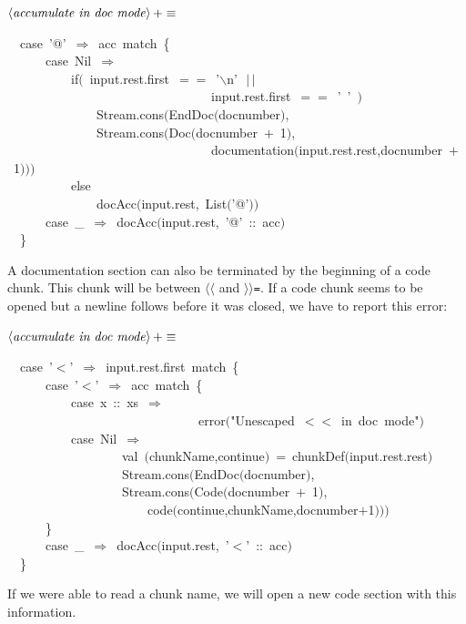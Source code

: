 \documentclass[a4paper,12pt]{article}
\begin{document}
$\left<\mbox{\emph{accumulate in doc mode}}\right>+\equiv$
\begin{program}~~{\vem case}~'@'~$\Rightarrow$~acc~{\vem match}~{\small\{}
\\~~~~~~{\vem case}~Nil~$\Rightarrow$
\\~~~~~~~~~~{\vem if}$($~input.rest.first~$==$~'$\backslash$n'~$\,|$$\,|$
\\~~~~~~~~~~~~~~~~~~~~~~~~~~~~~~~~input.rest.first~$==$~'~'~$)$
\\~~~~~~~~~~~~~~Stream.cons$($EndDoc$($docnumber$)$,
\\~~~~~~~~~~~~~~Stream.cons$($Doc$($docnumber~$+$~1$)$,
\\~~~~~~~~~~~~~~~~~~~~~~~~~~~~~~~~documentation$($input.rest.rest,docnumber~$+$~1$)$$)$$)$
\\~~~~~~~~~~{\vem else}
\\~~~~~~~~~~~~~~docAcc$($input.rest,~List$($'@'$)$$)$
\\~~~~~~{\vem case}~\_~$\Rightarrow$~docAcc$($input.rest,~'@'~{\rm :}{\rm :}~acc$)$
\\~~{\small\}}
\\[0.5em]\end{program}
A documentation section can also be terminated by the beginning of a
code chunk. This chunk will be between \texttt{$\langle$$\langle$} and \texttt{$\rangle$$\rangle$=}. If a code
chunk seems to be opened but a newline follows before it was closed,
we have to report this error:

$\left<\mbox{\emph{accumulate in doc mode}}\right>+\equiv$
\begin{program}~~{\vem case}~'$<$'~$\Rightarrow$~input.rest.first~{\vem match}~{\small\{}
\\~~~~~~{\vem case}~'$<$'~$\Rightarrow$~acc~{\vem match}~{\small\{}
\\~~~~~~~~~~{\vem case}~x~{\rm :}{\rm :}~xs~$\Rightarrow$
\\~~~~~~~~~~~~~~~~~~~~~~~~~~~~~~error$($"Unescaped~$<\!$$<$~in~doc~mode"$)$
\\~~~~~~~~~~{\vem case}~Nil~$\Rightarrow$
\\~~~~~~~~~~~~~~~~~~{\vem val}~$($chunkName,continue$)$~=~chunkDef$($input.rest.rest$)$
\\~~~~~~~~~~~~~~~~~~Stream.cons$($EndDoc$($docnumber$)$,
\\~~~~~~~~~~~~~~~~~~Stream.cons$($Code$($docnumber~$+$~1$)$,
\\~~~~~~~~~~~~~~~~~~~~~~code$($continue,chunkName,docnumber$+$1$)$$)$$)$
\\~~~~~~{\small\}}
\\~~~~~~{\vem case}~\_~$\Rightarrow$~docAcc$($input.rest,~'$<$'~{\rm :}{\rm :}~acc$)$
\\~~{\small\}}
\\[0.5em]\end{program}
If we were able to read a chunk name, we will open a new code section
with this information.
\end{document}
